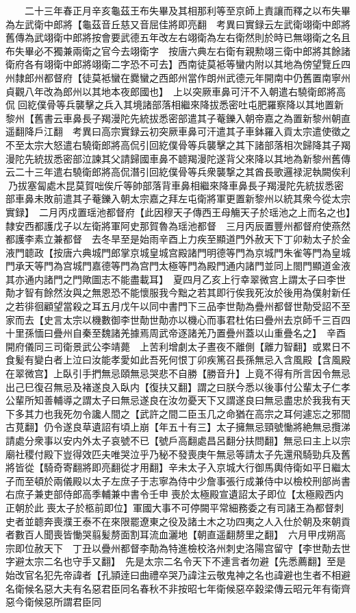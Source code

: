 　　二十三年春正月辛亥龜茲王布失畢及其相那利等至京師上責讓而釋之以布失畢為左武衛中郎將【龜茲音丘慈又音屈佳將即亮翻　考異曰實録云左武衛翊衛中郎將舊傳為武翊衛中郎將按會要武德五年改左右翊衛為左右衛然則於時已無翊衛之名且布失畢必不獨兼兩衛之官今去翊衛字　按唐六典左右衛有親勲翊三衛中郎將其餘諸衛府各有翊衛中郎將翊衛二字恐不可去】西南徒莫袛等蠻内附以其地為傍望覽丘四州隸郎州都督府【徒莫袛蠻在爨蠻之西郎州當作朗州武德元年開南中仍舊置南寧州貞觀八年改為郎州以其地本夜郎國也】　上以突厥車鼻可汗不入朝遣右驍衛郎將高侃回紇僕骨等兵襲擊之兵入其境諸部落相繼來降拔悉密吐屯肥羅察降以其地置新黎州【舊書云車鼻長子羯漫陀先統拔悉密部遣其子菴鑠入朝帝嘉之為置新黎州朝直遥翻降戶江翻　考異曰高宗實録云初突厥車鼻可汗遣其子車鉢羅入貢太宗遣使徵之不至太宗大怒遣右驍衛郎將高侃引回紇僕骨等兵襲擊之其下諸部落相次歸降其子羯漫陀先統拔悉密部泣諫其父請歸國車鼻不聼羯漫陀遂背父來降以其地為新黎州舊傳云二十三年遣右驍衛郎將高侃潛引回紇僕骨等兵衆襲撃之其酋長歌邏禄泥執闕俟利乃拔塞匐處木昆莫賀咄俟斤等帥部落背車鼻相繼來降車鼻長子羯漫陀先統拔悉密部車鼻未敗前遣其子菴鑠入朝太宗嘉之拜左屯衛將軍更置新黎州以統其衆今從太宗實録】　二月丙戍置瑶池都督府【此因穆天子傳西王母觴天子於瑶池之上而名之也】隸安西都護戊子以左衛將軍阿史那賀魯為瑶池都督　三月丙辰置豐州都督府使燕然都護李素立兼都督　去冬旱至是始雨辛酉上力疾至顯道門外赦天下丁卯勑太子於金液門聼政【按唐六典城門郎掌京城皇城宫殿諸門明德等門為京城門朱雀等門為皇城門承天等門為宫城門嘉德等門為宫門太極等門為殿門通内諸門並同上閤門顯道金液其亦通内諸門之門歟圖志不能盡載耳】　夏四月乙亥上行幸翠微宫上謂太子曰李世勣才智有餘然汝與之無恩恐不能懷服我今黜之若其即行俟我死汝於後用為僕射新任之若徘徊顧望當殺之耳五月戊午以同中書門下三品李世勣為疊州都督世勣受詔不至家而去【史言太宗以機數御李世勣世勣亦以機心而事君杜佑曰疊州去京師千三百四十里孫愐曰疊州自秦至魏諸羌據焉周武帝逐諸羌乃置疊州蓋以山重疊名之】　辛酉開府儀同三司衛景武公李靖薨　上苦利增劇太子晝夜不離側【離力智翻】或累日不食髪有變白者上泣曰汝能孝愛如此吾死何恨丁卯疾篤召長孫無忌入含風殿【含風殿在翠微宫】上臥引手捫無忌頤無忌哭悲不自勝【勝音升】上竟不得有所言因令無忌出己巳復召無忌及褚遂良入臥内【復扶又翻】謂之曰朕今悉以後事付公輩太子仁孝公輩所知善輔導之謂太子曰無忌遂良在汝勿憂天下又謂遂良曰無忌盡忠於我我有天下多其力也我死勿令讒人間之【武許之間二臣玉几之命猶在高宗之耳何遽忘之邪間古莧翻】仍令遂良草遺詔有頃上崩【年五十有三】太子擁無忌頸號慟將絶無忌攬涕請處分衆事以安内外太子哀號不已【號戶高翻處昌呂翻分扶問翻】無忌曰主上以宗廟社稷付殿下豈得效匹夫唯哭泣乎乃秘不發喪庚午無忌等請太子先還飛騎勁兵及舊將皆從【騎奇寄翻將即亮翻從才用翻】辛未太子入京城大行御馬輿侍衛如平日繼太子而至頓於兩儀殿以太子左庶子于志寧為侍中少詹事張行成兼侍中以檢校刑部尚書右庶子兼吏部侍郎高季輔兼中書令壬申喪於太極殿宣遺詔太子即位【太極殿西内正朝於此喪太子於柩前即位】軍國大事不可停闕平常細務委之有司諸王為都督刺史者並聼奔喪濮王泰不在來限罷遼東之役及諸土木之功四夷之人入仕於朝及來朝貢者數百人聞喪皆慟哭翦髪剺面割耳流血灑地【朝直遥翻剺里之翻】　六月甲戌朔高宗即位赦天下　丁丑以疊州都督李勣為特進檢校洛州刺史洛陽宫留守【李世勣去世字避太宗二名也守手又翻】　先是太宗二名令天下不連言者勿避【先悉薦翻】至是始改官名犯先帝諱者【孔頴逹曰曲禮卒哭乃諱注云敬鬼神之名也諱避也生者不相避名衛候名惡大夫有名惡君臣同名春秋不非按昭七年衛候惡卒穀梁傳云昭元年有衛齊惡今衛候惡所謂君臣同